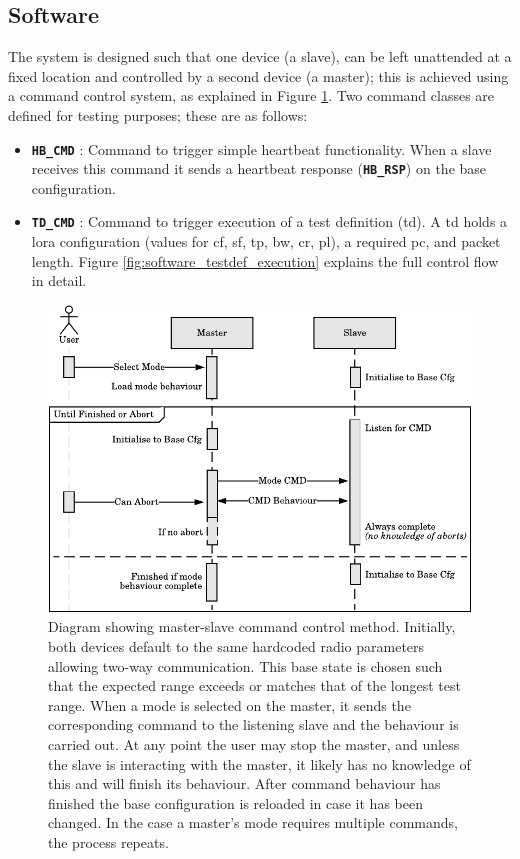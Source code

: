 \subsection{Software}\label{sec:test_platform_software}
The system is designed such that one device (a slave), can be left unattended at a fixed location and controlled by a second device (a master); this is achieved using a command control system, as explained in Figure \ref{fig:software_cmd_system}. Two command classes are defined for testing purposes; these are as follows:
\begin{itemize}
	\item {\textbf{\texttt{HB\_CMD}}} : Command to trigger simple heartbeat functionality. When a slave receives this command it sends a heartbeat response (\textbf{\texttt{HB\_RSP}}) on the base configuration.
	\item {\textbf{\texttt{TD\_CMD}}} : Command to trigger execution of a test definition (\ac{td}). A \ac{td} holds a \ac{lora} configuration (values for \ac{cf}, \ac{sf}, \ac{tp}, \ac{bw}, \ac{cr}, \ac{pl}), a required \ac{pc}, and packet length. Figure \ref{fig:software_testdef_execution} explains the full control flow in detail.
	\end{itemize}
\begin{figure}[H]
    \centering
    \includegraphics{Figures/software_cmd_system.pdf}
    \caption[Master-Slave command control method]{
    	Diagram showing master-slave command control method. Initially, both devices default to the same hardcoded radio parameters allowing two-way communication. This base state is chosen such that the expected range exceeds or matches that of the longest test range. When a mode is selected on the master, it sends the corresponding command to the listening slave and the behaviour is carried out. At any point the user may stop the master, and unless the slave is interacting with the master, it likely has no knowledge of this and will finish its behaviour. After command behaviour has finished the base configuration is reloaded in case it has been changed. In the case a master's mode requires multiple commands, the process repeats.
    }
    \label{fig:software_cmd_system}
\end{figure}
